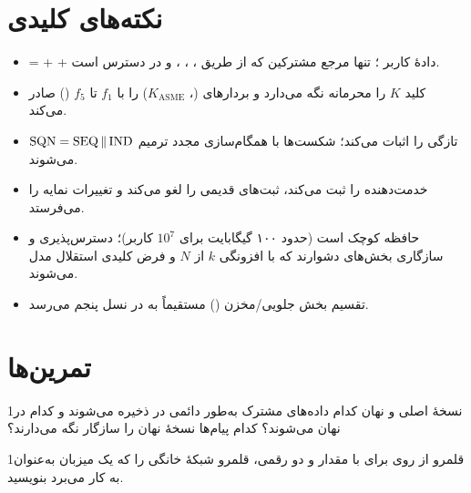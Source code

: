 \documentclass[11pt,a4paper]{article}
\begin{document}
\section{نکته‌های کلیدی}
\begin{takeawaybox}
\begin{itemize}
  \item {} =  +  + دادهٔ کاربر ؛ تنها مرجع مشترکین که از طریق ، ،
        ،  و  در دسترس است.
  \item {} کلید $K$ را محرمانه نگه می‌دارد و بردارهای (، $K_{\mathrm{ASME}}$) را با $f_1$ تا
        $f_5$ () صادر می‌کند.
  \item $\mathrm{SQN} = \mathrm{SEQ}\,\Vert\,\mathrm{IND}$ تازگی را اثبات می‌کند؛ شکست‌ها با همگام‌سازی مجدد 
        ترمیم می‌شوند.
  \item {}  خدمت‌دهنده را ثبت می‌کند، ثبت‌های قدیمی را لغو می‌کند و تغییرات نمایه را می‌فرستد.
  \item حافظه کوچک است (حدود ۱۰۰ گیگابایت برای $10^7$ کاربر)؛ دسترس‌پذیری و سازگاری بخش‌های دشوارند که با افزونگی
        $k$ از $N$ و فرض کلیدی استقلال مدل می‌شوند.
  \item تقسیم بخش جلویی/مخزن () مستقیماً به  در نسل پنجم می‌رسد.
\end{itemize}
\end{takeawaybox}

\section{تمرین‌ها}

\begin{exercisebox}{1}{نسخهٔ اصلی و نهان}\label{exr:split}
کدام داده‌های مشترک به‌طور دائمی در  ذخیره می‌شوند و کدام در  نهان می‌شوند؟ کدام پیام‌ها نسخهٔ نهان
را سازگار نگه می‌دارند؟
\end{exercisebox}

\begin{exercisebox}{1}{قلمرو از روی }\label{exr:realm}
برای  با مقدار  و  دو رقمی، قلمرو شبکهٔ خانگی  را که یک 
میزبان به‌عنوان  به کار می‌برد بنویسید.
\end{exercisebox}
\end{document}
